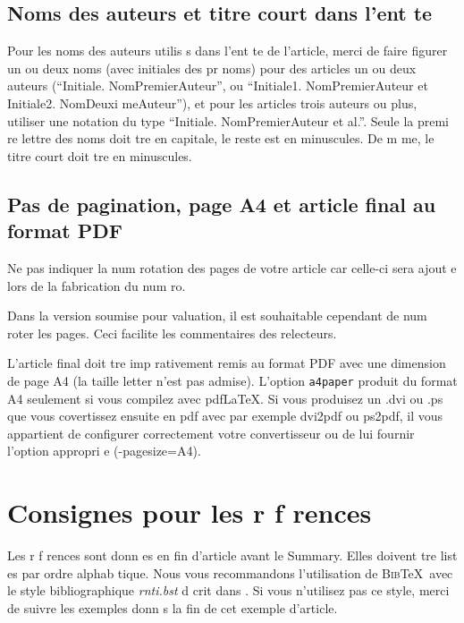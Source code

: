 \documentclass{article}
\begin{document}
\subsection{Noms des auteurs et titre court dans l'ent te}

Pour les noms des auteurs utilis s dans l'ent te de l'article, merci
de faire figurer un ou deux noms (avec initiales des pr noms) pour
des articles   un ou deux auteurs (``Initiale. NomPremierAuteur'',
ou ``Initiale1. NomPremierAuteur et Initiale2. NomDeuxi meAuteur''),
et pour les articles   trois auteurs ou plus, utiliser une notation
du type ``Initiale. NomPremierAuteur et al.''. Seule la premi re
lettre des noms doit  tre en capitale, le reste est en minuscules.
De m me, le titre court doit  tre en minuscules.



\subsection{Pas de pagination, page A4 et article final au format PDF}

Ne pas indiquer la num rotation des pages de votre article car
celle-ci sera ajout e lors de la fabrication du num ro.

Dans la version soumise pour  valuation, il est souhaitable
cependant de num roter les pages. Ceci facilite les commentaires des
relecteurs.

L'article final doit  tre imp rativement remis au format PDF avec
une dimension de page A4 (la taille letter n'est pas admise).
L'option \texttt{a4paper} produit du format A4 seulement si vous
compilez avec pdf\LaTeX{}. Si vous produisez un .dvi ou .ps que vous
covertissez ensuite en pdf avec par exemple dvi2pdf ou ps2pdf, il
vous appartient de configurer correctement votre convertisseur ou de
lui fournir l'option appropri e (-pagesize=A4).


\section{Consignes pour les r f rences}

Les r f rences sont donn es en fin d'article avant le
\guilo{}Summary\guilf{}. Elles doivent  tre list es par ordre
alphab tique.  Nous vous recommandons l'utilisation de
\textsc{Bib}\TeX\ avec le style bibliographique \textit{rnti.bst}
d crit dans \citet{ritschard:2005rnti}. Si vous n'utilisez pas ce
style, merci de suivre les exemples donn s   la fin de cet exemple
d'article.
\end{document}
